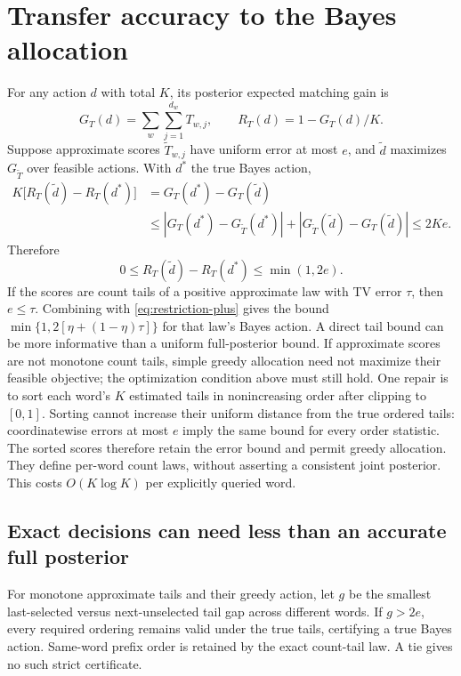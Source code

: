 \documentclass[10pt,a4paper]{article}
\begin{document}
\section{Transfer accuracy to the Bayes allocation}
\label{sec:decision-foundation}
For any action $d$ with total $K$, its posterior expected matching gain is
\[
 G_T(d)=\sum_w\sum_{j=1}^{d_w}T_{w,j},\qquad R_T(d)=1-G_T(d)/K.
\]
Suppose approximate scores $\widetilde T_{w,j}$ have uniform error at most $e$, and $\widetilde d$ maximizes
$G_{\widetilde T}$ over feasible actions. With $d^*$ the true Bayes action,
\begin{align}
 K\big[R_T(\widetilde d)-R_T(d^*)\big]
 &=G_T(d^*)-G_T(\widetilde d)\\
 &\leq |G_T(d^*)-G_{\widetilde T}(d^*)|
       +|G_{\widetilde T}(\widetilde d)-G_T(\widetilde d)|
 \leq 2Ke.
\end{align}
Therefore
\begin{equation}
 0\leq R_T(\widetilde d)-R_T(d^*)\leq\min(1,2e).
 \label{eq:decision-error}
\end{equation}
If the scores are count tails of a positive approximate law with TV error $\tau$, then $e\leq\tau$.
Combining with \eqref{eq:restriction-plus} gives the bound
$\min\{1,2[\eta+(1-\eta)\tau]\}$ for that law's Bayes action. A direct tail bound can be more informative
than a uniform full-posterior bound. If approximate scores are not monotone count tails, simple greedy
allocation need not maximize their feasible objective; the optimization condition above must still hold.
One repair is to sort each word's $K$ estimated tails in nonincreasing order after clipping to $[0,1]$.
Sorting cannot increase their uniform distance from the true ordered tails: coordinatewise errors at
most $e$ imply the same bound for every order statistic. The sorted scores therefore retain the error
bound and permit greedy allocation. They define per-word count laws, without asserting a consistent
joint posterior. This costs $O(K\log K)$ per explicitly queried word.

\clearpage
\subsection{Exact decisions can need less than an accurate full posterior}
For monotone approximate tails and their greedy action, let $g$ be the smallest last-selected versus
next-unselected tail gap across different words. If $g>2e$, every required ordering remains valid under the
true tails, certifying a true Bayes action. Same-word prefix order is retained by the exact count-tail law.
A tie gives no such strict certificate.
\end{document}
